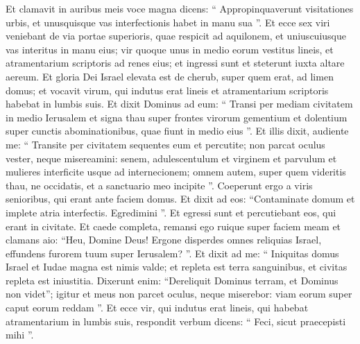 \begin{biblechapter}
\begin{biblechapter}
\begin{biblechapter}
\begin{biblechapter}
\begin{biblechapter}
\begin{biblechapter}
\begin{biblechapter}
\begin{biblechapter}
\begin{biblechapter}
\verse Et clamavit in auribus meis voce magna dicens: “ Appropinquaverunt visitationes urbis, et unusquisque vas interfectionis habet in manu sua ”. 
\verse Et ecce sex viri veniebant de via portae superioris, quae respicit ad aquilonem, et uniuscuiusque vas interitus in manu eius; vir quoque unus in medio eorum vestitus lineis, et atramentarium scriptoris ad renes eius; et ingressi sunt et steterunt iuxta altare aereum. 
\verse Et gloria Dei Israel elevata est de cherub, super quem erat, ad limen domus; et vocavit virum, qui indutus erat lineis et atramentarium scriptoris habebat in lumbis suis. 
\verse Et dixit Dominus ad eum: “ Transi per mediam civitatem in medio Ierusalem et signa thau super frontes virorum gementium et dolentium super cunctis abominationibus, quae fiunt in medio eius ”. 
\verse Et illis dixit, audiente me: “ Transite per civitatem sequentes eum et percutite; non parcat oculus vester, neque misereamini: 
\verse senem, adulescentulum et virginem et parvulum et mulieres interficite usque ad internecionem; omnem autem, super quem videritis thau, ne occidatis, et a sanctuario meo incipite ”. Coeperunt ergo a viris senioribus, qui erant ante faciem domus. 
\verse Et dixit ad eos: “Contaminate domum et implete atria interfectis. Egredimini ”. Et egressi sunt et percutiebant eos, qui erant in civitate.
 \verse Et caede completa, remansi ego ruique super faciem meam et clamans aio: “Heu, Domine Deus! Ergone disperdes omnes reliquias Israel, effundens furorem tuum super Ierusalem? ”. 
\verse Et dixit ad me: “ Iniquitas domus Israel et Iudae magna est nimis valde; et repleta est terra sanguinibus, et civitas repleta est iniustitia. Dixerunt enim: “Dereliquit Dominus terram, et Dominus non videt”; 
\verse igitur et meus non parcet oculus, neque miserebor: viam eorum super caput eorum reddam ”. 
\verse Et ecce vir, qui indutus erat lineis, qui habebat atramentarium in lumbis suis, respondit verbum dicens: “ Feci, sicut praecepisti mihi ”.
 

\end{biblechapter}
\end{biblechapter}
\end{biblechapter}
\end{biblechapter}
\end{biblechapter}
\end{biblechapter}
\end{biblechapter}
\end{biblechapter}
\end{biblechapter}
